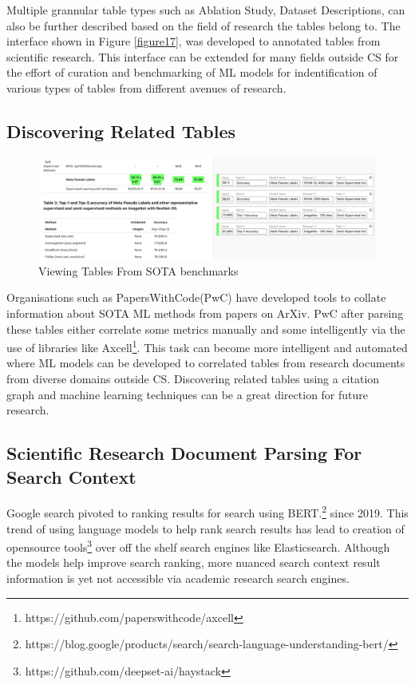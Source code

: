 Multiple grannular table types such as Ablation Study, Dataset Descriptions, can also be further described based on the field of research the tables belong to. The interface shown in Figure \ref{figure17}, was developed to annotated tables from scientific research. This interface can be extended for many fields outside CS for the effort of curation and benchmarking of ML models for indentification of various types of tables from different avenues of research. 

\subsection{Discovering Related Tables}
\begin{figure}[h]
    \centering
    \includegraphics[width=\maxwidth{\textwidth}]{src/images/pwc-table-exp.pdf}
    \caption{ Viewing Tables From SOTA benchmarks }
    \label{figure\arabic{figurecounter}}
\end{figure}
Organisations such as PapersWithCode(PwC) have developed tools to collate information about SOTA ML methods from papers on ArXiv. PwC after parsing these tables either correlate some metrics manually and some intelligently via the use of libraries like Axcell\footnote{https://github.com/paperswithcode/axcell}. This task can become more intelligent and automated where ML models can be developed to correlated tables from research documents from diverse domains outside CS. Discovering related tables using a citation graph and machine learning techniques can be a great direction for future research. 

\subsection{Scientific Research Document Parsing For Search Context}
Google search pivoted to ranking results for search using BERT.\footnote{https://blog.google/products/search/search-language-understanding-bert/} since 2019. This trend of using language models to help rank search results has lead to creation of opensource tools\footnote{https://github.com/deepset-ai/haystack} over off the shelf search engines like Elasticsearch. Although the models help improve search ranking, more nuanced search context result information is yet not accessible via academic research search engines. 

